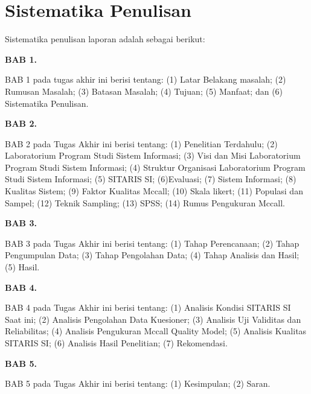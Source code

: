 \section{Sistematika Penulisan}
Sistematika penulisan laporan adalah sebagai berikut:

\textbf{BAB 1. \babSatu}

BAB 1 pada tugas akhir ini berisi tentang: (1) Latar Belakang masalah; (2) Rumusan Masalah; (3) Batasan Masalah; (4) Tujuan; (5) Manfaat; dan (6) Sistematika Penulisan.

\textbf{BAB 2. \babDua}

BAB 2 pada Tugas Akhir ini berisi tentang: (1) Penelitian Terdahulu; (2) Laboratorium Program Studi Sistem Informasi; (3) Visi dan Misi Laboratorium Program Studi Sistem Informasi; (4) Struktur Organisasi Laboratorium Program Studi Sistem Informasi; (5) SITARIS SI; (6)Evaluasi; (7) Sistem Informasi; (8) Kualitas Sistem; (9) Faktor Kualitas Mccall; (10) Skala likert; (11) Populasi dan Sampel; (12) Teknik Sampling; (13) SPSS; (14) Rumus Pengukuran Mccall.


\textbf{BAB 3. \babTiga}

BAB 3 pada Tugas Akhir ini berisi tentang: (1) Tahap Perencanaan; (2)
Tahap Pengumpulan Data; (3) Tahap Pengolahan Data; (4) Tahap Analisis dan
Hasil; (5) Hasil.


\textbf{BAB 4. \babEmpat}

BAB 4 pada Tugas Akhir ini berisi tentang: (1) Analisis Kondisi SITARIS SI Saat ini; (2) Analisis Pengolahan Data Kuesioner; (3) Analisis Uji Validitas dan Reliabilitas; (4) Analisis Pengukuran Mccall Quality Model; (5) Analisis Kualitas SITARIS SI; (6) Analisis Hasil Penelitian; (7) Rekomendasi.

\textbf{BAB 5. \babLima}

BAB 5 pada Tugas Akhir ini berisi tentang: (1) Kesimpulan; (2) Saran.


